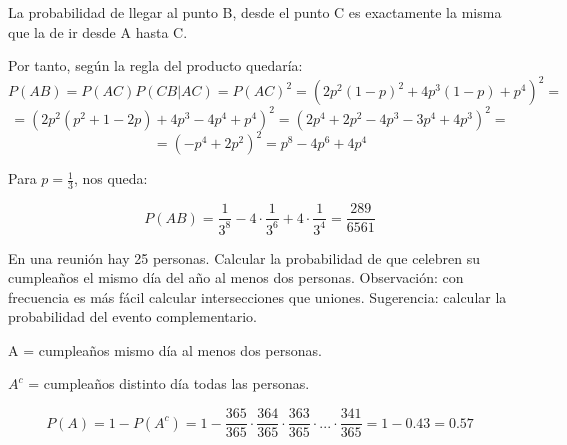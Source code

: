 \begin{problem}[8]
\begin{expla}
La probabilidad de llegar al punto B, desde el punto C es exactamente la misma que la de ir desde A hasta C.
\end{expla}
Por tanto, según la regla del producto quedaría:
\[
P(AB)=P(AC)P(CB|AC)=P(AC)^2=(2p^2(1-p)^2+4p^3(1-p)+p^4)^2=
\]
\[
=(2p^2(p^2+1-2p)+4p^3-4p^4+p^4)^2 = (2p^4 + 2p^2-4p^3-3p^4+4p^3)^2 =
\]
\[
=(-p^4+2p^2)^2=p^8-4p^6+4p^4
\]

Para $p=\frac{1}{3}$, nos queda:

\[
P(AB)=\frac{1}{3^8}-4\cdot\frac{1}{3^6}+4\cdot\frac{1}{3^4}=\frac{289}{6561}
\]



\end{problem}


\begin{problem}[9]En una reuni\'on hay 25 personas. Calcular la
probabilidad de que celebren su cumplea\~{n}os el mismo d\'ia del
a\~{n}o al menos dos personas. Observación: con frecuencia es m\'as f\'acil
calcular intersecciones que uniones. Sugerencia: calcular la probabilidad
del evento complementario.
\solution


A = cumpleaños mismo día al menos dos personas.

$A^c$ = cumpleaños distinto día todas las personas.

\[
P(A)=1-P(A^c)=1-\frac{365}{365}\cdot\frac{364}{365}\cdot\frac{363}{365}\cdot...\cdot\frac{341}{365}=1-0.43=0.57
\]

\end{problem}


